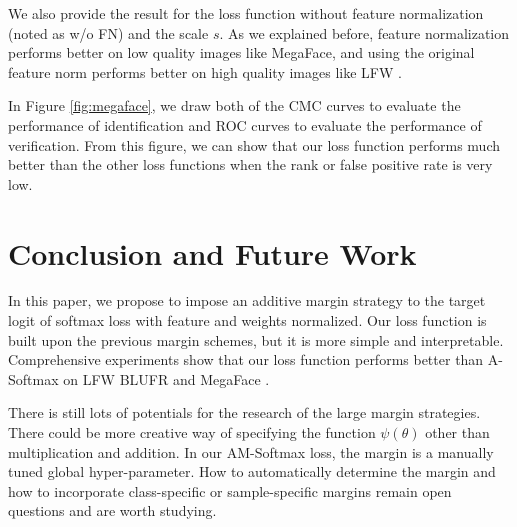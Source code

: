 \documentclass[10pt,twocolumn,letterpaper]{article}
\begin{document}
We also provide the result for the loss function without feature normalization (noted as w/o FN) and the scale $s$. As we explained before, feature normalization performs better on low quality images like MegaFace\cite{kemelmacher2016megaface}, and using the original feature norm performs better on high quality images like LFW \cite{huang2007labeled}.

In Figure \ref{fig:megaface}, we draw both of the CMC curves to evaluate the performance of identification and ROC curves to evaluate the performance of verification. From this figure, we can show that our loss function performs much better than the other loss functions when the rank or false positive rate is very low. 

\section{Conclusion and Future Work}
In this paper, we propose to impose an additive margin strategy to the target logit of softmax loss with feature and weights normalized. Our loss function is built upon the previous margin schemes\cite{liu2017sphereface,liu2016large}, but it is more simple and interpretable. Comprehensive experiments show that our loss function performs better than A-Softmax \cite{liu2017sphereface} on LFW BLUFR \cite{liao2014benchmark} and MegaFace \cite{kemelmacher2016megaface}. 

There is still lots of potentials for the research of the large margin strategies. There could be more creative way of specifying the function $\psi(\theta)$ other than multiplication and addition. In our AM-Softmax loss, the margin is a manually tuned global hyper-parameter. How to automatically determine the margin and how to incorporate class-specific or sample-specific margins remain open questions and are worth studying.

{\small


}
\end{document}
